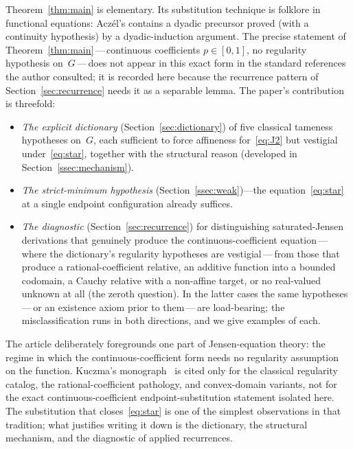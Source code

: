 \documentclass{article}
\theoremstyle{plain}
\theoremstyle{definition}
\begin{document}
Theorem~\ref{thm:main} is elementary. Its substitution
technique is folklore in functional equations: Acz\'el's
\cite[\S2.1.4]{Aczel1966} contains a dyadic precursor proved (with a
continuity hypothesis) by a dyadic-induction argument. The precise
statement of Theorem~\ref{thm:main}\,---\,continuous coefficients
$p\in[0,1]$, no regularity hypothesis on~$G$\,---\,does not appear in
this exact form in the standard references the author consulted; it is
recorded here because the recurrence pattern of
Section~\ref{sec:recurrence} needs it as a separable lemma. The paper's contribution is threefold:
\begin{itemize}
\item \emph{The explicit dictionary} (Section~\ref{sec:dictionary}) of
  five classical tameness hypotheses on~$G$, each sufficient to force
  affineness for~\eqref{eq:J2} but vestigial under~\eqref{eq:star},
  together with the structural reason (developed in Section~\ref{ssec:mechanism}).

\item \emph{The strict-minimum hypothesis}
  (Section~\ref{ssec:weak})---the
  equation~\eqref{eq:star} at a single endpoint configuration already
  suffices.

\item \emph{The diagnostic} (Section~\ref{sec:recurrence}) for
  distinguishing saturated-Jensen derivations that genuinely produce
  the continuous-coefficient equation\,---\,where the dictionary's
  regularity hypotheses are vestigial\,---\,from those that produce a
  rational-coefficient relative, an additive function into a bounded
  codomain, a Cauchy relative with a non-affine target, or no
  real-valued unknown at all (the zeroth question). In the
  latter cases the same hypotheses\,---\,or an existence axiom prior
  to them\,---\,are load-bearing; the
  misclassification runs in both directions, and we give examples of
  each.
\end{itemize}

The article deliberately foregrounds one part of Jensen-equation
theory: the regime in which the continuous-coefficient form needs no
regularity assumption on the function. Kuczma's monograph~\cite{Kuczma2009}
is cited only for the classical regularity catalog, the rational-coefficient
pathology, and convex-domain variants, not for the exact
continuous-coefficient endpoint-substitution statement isolated here.
The substitution that closes~\eqref{eq:star} is one of the simplest
observations in that tradition; what justifies writing it down is the
dictionary, the structural mechanism, and the diagnostic of applied
recurrences.
\end{document}
